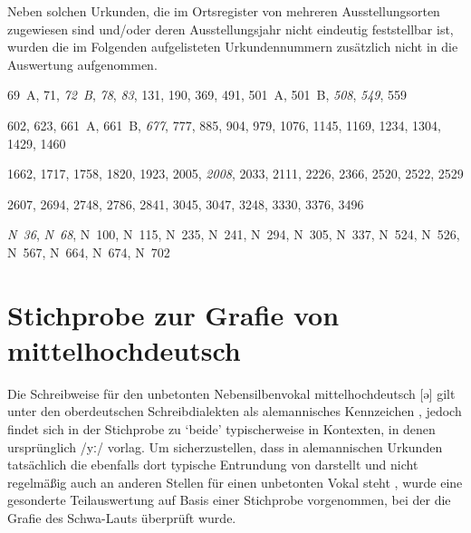 Neben solchen Urkunden, die im Ortsregister von \citet{cao-online} mehreren
Ausstellungsorten zugewiesen sind und/oder deren Ausstellungsjahr nicht
eindeutig feststellbar ist, wurden die im Folgenden
aufgelisteten Urkundennummern zusätzlich nicht in die Auswertung aufgenommen.

{%
\setlength{\columnsep}{35pt} %
\raggedright
\begin{multicols}{2}
\begin{description}[
	font=\normalfont,
	labelsep=\fontdimen2\font,
	leftmargin=1.4cm, %
]
\item[\cite{cao1},] 69~A, 71, \emph{72~B}, \emph{78}, \emph{83}, 131, 190, 369,
491, 501~A, 501~B, \emph{508}, \emph{549}, 559

\item[\cite{cao2},] 602, 623, 661~A, 661~B, \emph{677}, 777, 885, 904, 979,
1076, 1145, 1169, 1234, 1304, 1429, 1460

\item[\cite{cao3},] 1662, 1717, 1758, 1820, 1923, 2005, \emph{2008}, 2033, 2111,
2226, 2366, 2520, 2522, 2529

\item[\cite{cao4},] 2607, 2694, 2748, 2786, 2841, 3045, 3047, 3248, 3330, 3376,
3496

\item[\cite{cao5},] \emph{N~36}, \emph{N~68}, N~100, N~115, N~235, N~241, N~294,
N~305, N~337, N~524, N~526, N~567, N~664, N~674, N~702
\end{description}
\end{multicols}
}


\chapter{Stichprobe zur Grafie von mittelhochdeutsch }
\label{sec:caoalemschwa}

Die Schreibweise  für den unbetonten Nebensilbenvokal
mittelhochdeutsch  [ə] gilt unter den
ober\-deutschen Schreibdialekten als alemannisches Kennzeichen
\autocites[vgl.][25]{weinhold1863}[75]{weinhold1883}[41, 113]{paul2007}, jedoch
findet sich  in der Stichprobe zu  `beide' typischerweise
in Kontexten, in denen ursprünglich  /yː/ vorlag. Um sicherzustellen,
dass  in alemannischen Urkunden tatsächlich die ebenfalls dort
typische Entrundung von  darstellt und nicht regelmäßig auch an
anderen Stellen für einen unbetonten Vokal steht
\autocites%
	[466--467]{schirmunski1962}%
	[41]{paul2007}%
	[305]{ksw2}%
	[vgl.~auch][131--132]{boesch1946}%
, wurde eine gesonderte Teilauswertung auf Basis einer Stichprobe vorgenommen,
bei der die Grafie des Schwa-Lauts überprüft wurde.

